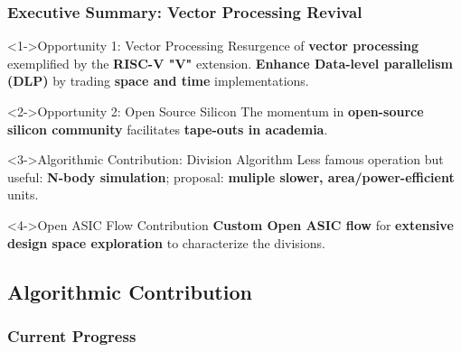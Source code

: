 \begin{frame}
    \frametitle{Executive Summary: Vector Processing Revival}
    \scriptsize



\begin{alertblock}<1->{Opportunity 1: Vector Processing}
	Resurgence of \textbf{vector processing} exemplified by the \textbf{RISC-V "V"} extension. \textbf{Enhance Data-level parallelism (DLP)} by trading \textbf{space and time} implementations.
\end{alertblock}

    \begin{alertblock}<2->{Opportunity 2: Open Source Silicon}
	    The momentum in \textbf{open-source silicon community} facilitates \textbf{tape-outs in academia}.
    \end{alertblock}

    \begin{block}<3->{Algorithmic Contribution: Division Algorithm}
	    Less famous operation but useful: \textbf{N-body simulation}; proposal: \textbf{muliple slower, area/power-efficient} units.
    \end{block}
    \begin{block}<4->{Open ASIC Flow Contribution}
	    \textbf{Custom Open ASIC flow} for \textbf{extensive design space exploration} to characterize the divisions.
    \end{block}


\end{frame}

\subsection{Algorithmic Contribution}
\begin{frame}
    \frametitle{Current Progress}

    \tableofcontents[currentsection,
                     subsectionstyle=show/shaded/hide,
                     sectionstyle=show/hide]

\end{frame}

